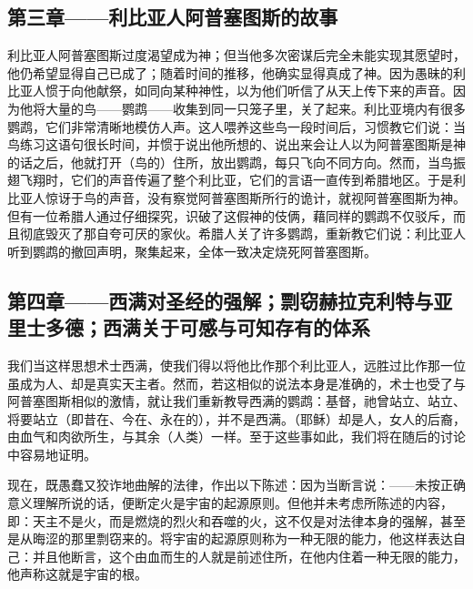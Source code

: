 
\subsection{第三章——利比亚人阿普塞图斯的故事}

利比亚人阿普塞图斯过度渴望成为神；但当他多次密谋后完全未能实现其愿望时，他仍希望显得自己已成了；随着时间的推移，他确实显得真成了神。因为愚昧的利比亚人惯于向他献祭，如同向某种神性，以为他们听信了从天上传下来的声音。因为他将大量的鸟——鹦鹉——收集到同一只笼子里，关了起来。利比亚境内有很多鹦鹉，它们非常清晰地模仿人声。这人喂养这些鸟一段时间后，习惯教它们说：当鸟练习这语句很长时间，并惯于说出他所想的、说出来会让人以为阿普塞图斯是神的话之后，他就打开（鸟的）住所，放出鹦鹉，每只飞向不同方向。然而，当鸟振翅飞翔时，它们的声音传遍了整个利比亚，它们的言语一直传到希腊地区。于是利比亚人惊讶于鸟的声音，没有察觉阿普塞图斯所行的诡计，就视阿普塞图斯为神。但有一位希腊人通过仔细探究，识破了这假神的伎俩，藉同样的鹦鹉不仅驳斥，而且彻底毁灭了那自夸可厌的家伙。希腊人关了许多鹦鹉，重新教它们说：利比亚人听到鹦鹉的撤回声明，聚集起来，全体一致决定烧死阿普塞图斯。\par


\subsection{第四章——西满对圣经的强解；剽窃赫拉克利特与亚里士多德；西满关于可感与可知存有的体系}

我们当这样思想术士西满，使我们得以将他比作那个利比亚人，远胜过比作那一位虽成为人、却是真实天主者。然而，若这相似的说法本身是准确的，术士也受了与阿普塞图斯相似的激情，就让我们重新教导西满的鹦鹉：基督，祂曾站立、站立、将要站立（即昔在、今在、永在的），并不是西满。（耶稣）却是人，女人的后裔，由血气和肉欲所生，与其余（人类）一样。至于这些事如此，我们将在随后的讨论中容易地证明。\par

现在，既愚蠢又狡诈地曲解的法律，作出以下陈述：因为当断言说：——未按正确意义理解所说的话，便断定火是宇宙的起源原则。但他并未考虑所陈述的内容，即：天主不是火，而是燃烧的烈火和吞噬的火，这不仅是对法律本身的强解，甚至是从晦涩的那里剽窃来的。将宇宙的起源原则称为一种无限的能力，他这样表达自己：并且他断言，这个由血而生的人就是前述住所，在他内住着一种无限的能力，他声称这就是宇宙的根。\par

